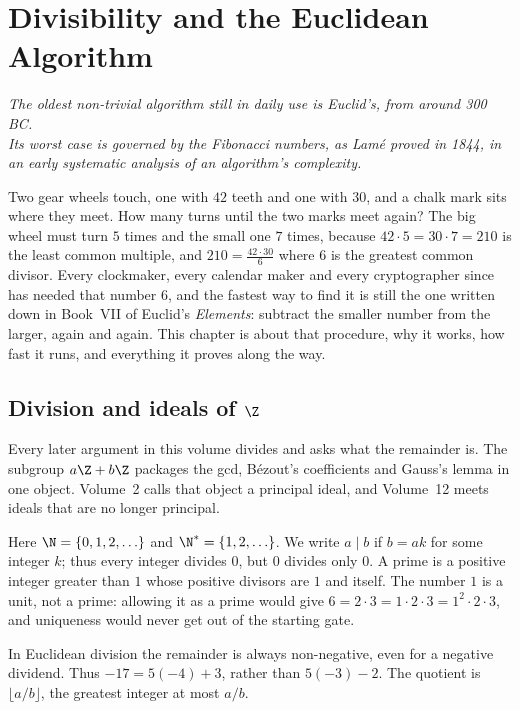 \chapter{Divisibility and the Euclidean Algorithm}\label{ch:divisibility}

\begin{center}\itshape
The oldest non-trivial algorithm still in daily use is Euclid's, from around 300 BC.\\
Its worst case is governed by the Fibonacci numbers, as Lam\'e proved in 1844, in an early systematic analysis of an algorithm's complexity.
\end{center}

Two gear wheels touch, one with $42$ teeth and one with $30$, and a chalk mark sits where they meet. How many turns until the two marks meet again?
The big wheel must turn $5$ times and the small one $7$ times, because $42\cdot5=30\cdot7=210$ is the least common multiple, and $210=\frac{42\cdot30}6$
where $6$ is the greatest common divisor. Every clockmaker, every calendar maker and every cryptographer since has needed that number $6$, and the
fastest way to find it is still the one written down in Book~VII of Euclid's \emph{Elements}: subtract the smaller number from the larger, again and
again. This chapter is about that procedure, why it works, how fast it runs, and everything it proves along the way.

\section{Division and ideals of \texorpdfstring{$\Z$}{Z}}

Every later argument in this volume divides and asks what the remainder is. The subgroup $a\Z+b\Z$ packages the gcd, Bézout's coefficients and Gauss's lemma in one object. Volume~2 calls that object a principal ideal, and Volume~12 meets ideals that are no longer principal.

\begin{reminder}
Here $\N=\{0,1,2,\ldots\}$ and $\N^*=\{1,2,\ldots\}$. We write $a\mid b$ if $b=ak$ for some integer $k$; thus every integer divides $0$, but $0$ divides only $0$. A prime is a positive integer greater than $1$ whose positive divisors are $1$ and itself. The number $1$ is a unit, not a prime: allowing it as a prime would give $6=2\cdot3=1\cdot2\cdot3=1^2\cdot2\cdot3$, and uniqueness would never get out of the starting gate.

In Euclidean division the remainder is always non-negative, even for a negative dividend. Thus $-17=5(-4)+3$, rather than $5(-3)-2$. The quotient is $\lfloor a/b\rfloor$, the greatest integer at most $a/b$.
\end{reminder}


